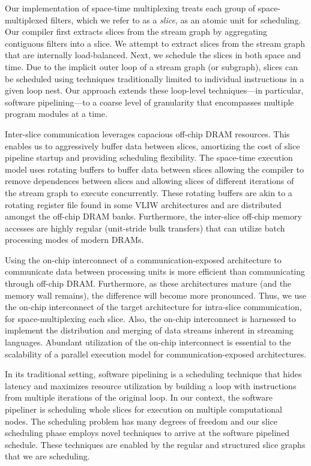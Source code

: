 Our implementation of space-time multiplexing treats each group of
space-multiplexed filters, which we refer to as a {\it slice}, as an
atomic unit for scheduling. Our compiler first extracts slices from
the stream graph by aggregating contiguous filters into a slice. We
attempt to extract slices from the stream graph that are internally
load-balanced. Next, we schedule the slices in both space and time.
Due to the implicit outer loop of a stream graph (or
subgraph), slices can be scheduled using techniques traditionally
limited to individual instructions in a given loop nest.  Our approach
extends these loop-level techniques---in particular, software
pipelining---to a coarse level of granularity that encompasses
multiple program modules at a time.

Inter-slice communication leverages capacious off-chip DRAM resources.
This enables us to aggressively buffer data between slices, amortizing
the cost of slice pipeline startup and providing scheduling
flexibility. The space-time execution model uses rotating buffers to
buffer data between slices allowing the compiler to remove dependences
between slices and allowing slices of different iterations of the
stream graph to execute concurrently.  These rotating buffers are akin
to a rotating register file found in some VLIW
architectures and are distributed amongst the off-chip DRAM
banks. Furthermore, the inter-slice off-chip memory accesses are
highly regular (unit-stride bulk transfers) that can utilize batch
processing modes of modern DRAMs. 

Using the on-chip interconnect of a communication-exposed architecture
to communicate data between processing units is more efficient than
communicating through off-chip DRAM. Furthermore, as these
architectures mature (and the memory wall remains), the difference
will become more pronounced.  Thus, we use the on-chip interconnect of
the target architecture for intra-slice communication, for
space-multiplexing each slice.  Also, the on-chip interconnect is
harnessed to implement the distribution and merging of data streams
inherent in streaming languages. Abundant utilization of the on-chip
interconnect is essential to the scalability of a parallel execution
model for communication-exposed architectures.

In its traditional setting, software pipelining \cite{lam-softpipe,
rau-softpipe} is a scheduling technique that hides latency and
maximizes resource utilization by building a loop with instructions
from multiple iterations of the original loop.  In our context, the
software pipeliner is scheduling whole slices for execution on
multiple computational nodes. The scheduling problem has many degrees
of freedom and our slice scheduling phase employs novel techniques to
arrive at the software pipelined schedule.  These techniques are
enabled by the regular and structured slice graphs that we are
scheduling. 

